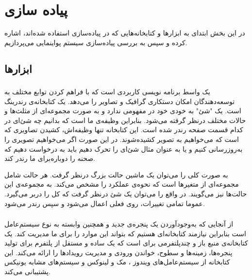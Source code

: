 \chapter { پیاده سازی }

در این بخش ابتدای به ابزار‌ها و کتابخانه‌هایی که در پیاده‌سازی استفاده شده‌اند، اشاره کرده و سپس 
به بررسی پیاده‌سازی سیستم پواینمایی می‌پردازیم.


\section {ابزارها}

\subsection {
    }

یک واسط برنامه نویسی کاربردی  
است که با فراهم کردن توابع مختلف به توسعه‌دهندگان امکان دستکاری گرافیک و تصاویر را می‌دهد.
یک کتابخانه‌ی رندرینگ است.
یک "شئ" به خودی خود در
مفهومی ندارد
و به صورت مجموعه‌ای از مثلث‌ها و حالات مختلف درنظر گرفته می‌شود. بنابراین  
وظیفه‌ی ما است که بدانیم چه شئ‌ای در کدام قسمت صفحه رندر شده است. این کتابخانه تنها وظیفه‌اش، کشیدن تصاویری که است که می‌خواهیم به تصویر کشیده‌شوند.
در این صورت اگر می‌خواهیم تصویری را به‌روزرسانی کنیم و یا به عنوان مثال شئ‌ای را تحرک دهیم باید به 
درخواست دهیم که صحنه را دوباره‌برای ما رندر کند.
\cite{KhronosUsingOpenGL}

به صورت کلی 
را می‌توان یک ماشین حالت بزرگ درنظر گرفت. هر حالت شامل مجموعه‌ای از متغیر‌ها است که نحوه‌ی عملکرد
را مشخص می‌کند. 
به مجموعه‌ی این حالت‌ها 
نیز می‌گویند. 
در واقع  
را می‌توان یک شئ درنظر گرفت که کل
را دربر می‌گیرد. عموما تمامی تغییرات، روی 
فعلی اعمال می‌شود و سپس رندر می‌شود.
\cite{KhronosUsingOpenGL} \cite{LearnOpenGL_GettingStarted}


\subsection{}

از آنجایی که به‌وجود‌آوردن یک پنجره‌ی جدید و همچنین 
وابسته به نوع سیستم‌عامل است بنابراین نیازمند کتابخانه‌ای هستیم که بتواند این موارد را برای ما مدیریت کند.
یک کتابخانه‌ی منبع باز و چندپلتفرمی برای 
است که یک
ساده و مستقل از پلتفرم برای تولید پنجره‌ها، زمینه‌‌ها
و سطوح، خواندن ورودی و مدیریت رویداد‌ها
را ارائه می‌کند. 
این کتابخانه از سیستم‌عامل‌های 
ویندوز
، 
مک
و 
لینوکس
و سیستم‌های مشابه یونیکس پشتیبانی ‌می‌کند.
\cite{GLFW}


